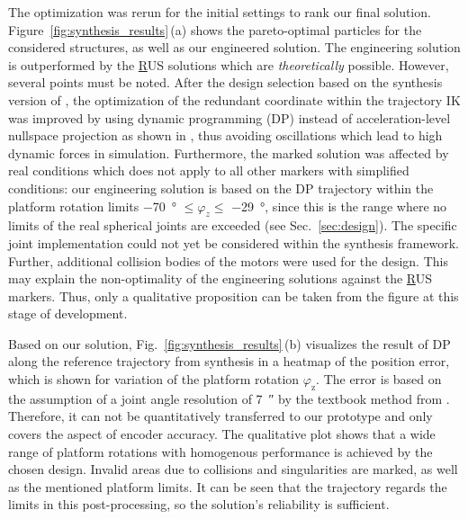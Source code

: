 \documentclass[runningheads]{llncs}
\begin{document}
The optimization was rerun for the initial settings to rank our final solution. 
Figure~\ref{fig:synthesis_results}\,(a) shows the pareto-optimal particles for the considered structures, as well as our engineered solution.
The engineering solution is outperformed by the \underline{R}US solutions which are \emph{theoretically} possible. 
However, several points must be noted. 
After the design selection based on the synthesis version of \cite{Schappler2022_ARK_3T1R}, the optimization of the redundant coordinate within the trajectory IK was improved by using dynamic programming (DP) instead of acceleration-level nullspace projection as shown in \cite{Schappler2023_ICINCOLNEE}, thus avoiding oscillations which lead to high dynamic forces in simulation. 
Furthermore, the marked solution was affected by real conditions which does not apply to all other markers with simplified conditions: our engineering solution is based on the DP trajectory within the platform rotation limits \SI{-70}{\degree} $\leq \varphi_z \leq$ \SI{-29}{\degree}, since this is the range where no limits of the real spherical joints are exceeded (see Sec.~\ref{sec:design}). 
The specific joint implementation could not yet be considered within the synthesis framework.
Further, additional collision bodies of the motors were used for the design. 
This may explain the non-optimality of the engineering solutions against the \underline{R}US markers. 
Thus, only a qualitative proposition can be taken from the figure at this stage of development. 

Based on our solution, Fig.~\ref{fig:synthesis_results}\,(b) visualizes the result of DP along the reference trajectory from synthesis in a heatmap of the position error, which is shown for variation of the platform rotation $\varphi_\text{z}$. 
The error is based on the assumption of a joint angle resolution of \SI{7}{\arcsecond} by the textbook method from \cite{Merlet2006}. Therefore, it can not be quantitatively transferred to our prototype and only covers the aspect of encoder accuracy. 
The qualitative plot shows that a wide range of platform rotations with homogenous performance is achieved by the chosen design.
Invalid areas due to collisions and singularities are marked, as well as the mentioned platform limits. 
It can be seen that the trajectory regards the limits in this post-processing, so the solution's reliability is sufficient.
% 
\end{document}
